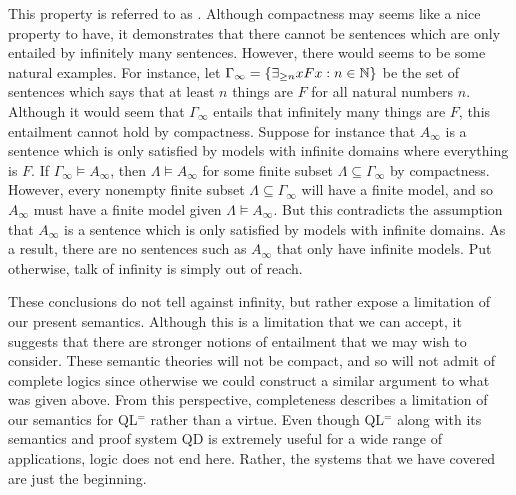 This property is referred to as .
Although compactness may seems like a nice property to have, it demonstrates that there cannot be sentences which are only entailed by infinitely many sentences.
However, there would seems to be some natural examples.
For instance, let $\Gamma_\infty=\lbrace\exists_{\geq n}xFx:n\in\mathbb{N}\rbrace$ be the set of sentences which says that at least $n$ things are $F$ for all natural numbers $n$. 
Although it would seem that $\Gamma_\infty$ entails that infinitely many things are $F$, this entailment cannot hold by compactness.
Suppose for instance that $A_\infty$ is a sentence which is only satisfied by models with infinite domains where everything is $F$.
If $\Gamma_\infty\models A_\infty$, then $\Lambda\models A_\infty$ for some finite subset $\Lambda\subseteq\Gamma_\infty$ by compactness.
However, every nonempty finite subset $\Lambda\subseteq\Gamma_\infty$ will have a finite model, and so $A_\infty$ must have a finite model given $\Lambda\models A_\infty$. 
But this contradicts the assumption that $A_\infty$ is a sentence which is only satisfied by models with infinite domains.
As a result, there are no sentences such as $A_\infty$ that only have infinite models. %
Put otherwise, talk of infinity is simply out of reach.

These conclusions do not tell against infinity, but rather expose a limitation of our present semantics.
Although this is a limitation that we can accept, it suggests that there are stronger notions of entailment that we may wish to consider.
These semantic theories will not be compact, and so will not admit of complete logics since otherwise we could construct a similar argument to what was given above.
From this perspective, completeness describes a limitation of our semantics for QL$^=$ rather than a virtue.
Even though QL$^=$ along with its semantics and proof system QD is extremely useful for a wide range of applications, logic does not end here. 
Rather, the systems that we have covered are just the beginning.

\iffalse

\practiceproblems

